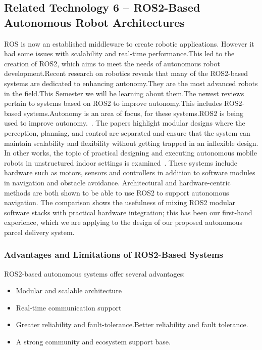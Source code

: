 \subsection{Related Technology 6 -- ROS2-Based Autonomous Robot Architectures}

ROS is now an established middleware to create robotic applications. However it had some issues with scalability and real-time performance.This led to the creation of ROS2, which aims to meet the needs of autonomous robot development.Recent research on robotics reveals that many of the ROS2-based systems are dedicated to enhancing autonomy.They are the most advanced robots in the field.This Semester we will be learning about them.The newest reviews pertain to systems based on ROS2 to improve autonomy.This includes ROS2-based systems.Autonomy is an area of focus, for these systems.ROS2 is being used to improve autonomy.~\cite{bonci2023ros2}. The papers highlight modular designs where the perception, planning, and control are separated and ensure that the system can maintain scalability and flexibility without getting trapped in an inflexible design. In other works, the topic of practical designing and executing autonomous mobile robots in unstructured indoor settings is examined~\cite{gargouri2024cost}. These systems include hardware such as motors, sensors and controllers in addition to software modules in navigation and obstacle avoidance. Architectural and hardware-centric methods are both shown to be able to use ROS2 to support autonomous navigation. The comparison shows the usefulness of mixing ROS2 modular software stacks with practical hardware integration; this has been our first-hand experience, which we are applying to the design of our proposed autonomous parcel delivery system.

\subsubsection{Advantages and Limitations of ROS2-Based Systems}

ROS2-based autonomous systems offer several advantages:

\begin{itemize}
\item Modular and scalable architecture
\item Real-time communication support
\item Greater reliability and fault-tolerance.Better reliability and fault tolerance.
\item A strong community and ecosystem support base.
\end{itemize}

